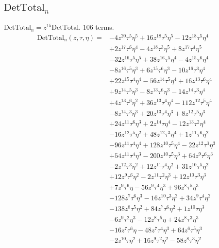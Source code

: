 \subsection*{$\mathrm{DetTotal}_n$}
$\mathrm{DetTotal}_n=z^{15}\mathrm{DetTotal}$. 106 terms.
{\small
\begin{align*}
\mathrm{DetTotal}_n(z,\tau,\eta)={}&-4z^{20}\tau^{5}\eta^{5}+16z^{18}\tau^{5}\eta^{5}-12z^{18}\tau^{5}\eta^{4}\\
&+2z^{17}\tau^{6}\eta^{4}-4z^{18}\tau^{3}\eta^{5}+8z^{17}\tau^{4}\eta^{5}\\
&-32z^{16}\tau^{5}\eta^{5}+38z^{16}\tau^{5}\eta^{4}-4z^{15}\tau^{6}\eta^{4}\\
&-8z^{16}\tau^{5}\eta^{3}+6z^{15}\tau^{6}\eta^{3}-10z^{16}\tau^{3}\eta^{4}\\
&+22z^{15}\tau^{4}\eta^{4}-56z^{14}\tau^{5}\eta^{4}+16z^{13}\tau^{6}\eta^{4}\\
&+9z^{14}\tau^{5}\eta^{3}-8z^{13}\tau^{6}\eta^{3}-14z^{14}\tau^{3}\eta^{4}\\
&+4z^{13}\tau^{6}\eta^{2}+36z^{13}\tau^{4}\eta^{4}-112z^{12}\tau^{5}\eta^{4}\\
&-8z^{14}\tau^{3}\eta^{3}+20z^{13}\tau^{4}\eta^{3}+8z^{12}\tau^{5}\eta^{3}\\
&+24z^{11}\tau^{6}\eta^{3}+2z^{14}\tau\eta^{4}-12z^{13}\tau^{2}\eta^{4}\\
&-16z^{12}\tau^{5}\eta^{2}+48z^{12}\tau^{3}\eta^{4}+1z^{11}\tau^{6}\eta^{2}\\
&-96z^{11}\tau^{4}\eta^{4}+128z^{10}\tau^{5}\eta^{4}-22z^{12}\tau^{3}\eta^{3}\\
&+54z^{11}\tau^{4}\eta^{3}-200z^{10}\tau^{5}\eta^{3}+64z^{9}\tau^{6}\eta^{3}\\
&-2z^{12}\tau^{3}\eta^{2}+12z^{11}\tau^{4}\eta^{2}+31z^{10}\tau^{5}\eta^{2}\\
&+12z^{9}\tau^{6}\eta^{2}-2z^{11}\tau^{2}\eta^{3}+12z^{10}\tau^{3}\eta^{3}\\
&+7z^{9}\tau^{6}\eta-56z^{9}\tau^{4}\eta^{3}+96z^{8}\tau^{5}\eta^{3}\\
&-128z^{7}\tau^{6}\eta^{3}-16z^{10}\tau^{3}\eta^{2}+34z^{9}\tau^{4}\eta^{2}\\
&-138z^{8}\tau^{5}\eta^{2}+84z^{7}\tau^{6}\eta^{2}+1z^{10}\tau\eta^{3}\\
&-6z^{9}\tau^{2}\eta^{3}-12z^{8}\tau^{5}\eta+24z^{8}\tau^{3}\eta^{3}\\
&-16z^{7}\tau^{6}\eta-48z^{7}\tau^{4}\eta^{3}+64z^{6}\tau^{5}\eta^{3}\\
&-2z^{10}\tau\eta^{2}+16z^{9}\tau^{2}\eta^{2}-58z^{8}\tau^{3}\eta^{2}\\

\end{align*}}
